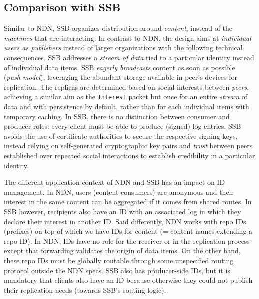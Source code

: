 \documentclass[9pt,sigconf]{acmart}
\begin{document}

\subsection{Comparison with SSB}

Similar to NDN, SSB organizes distribution around {\em content}, instead of the {\em machines} that are interacting. In contrast to NDN, the design aims at \textit{individual users as publishers} instead of larger organizations with the following technical consequences. SSB addresses a \textit{stream of data} tied to a particular identity instead of individual data items. SSB \textit{eagerly broadcasts} content as soon as possible (\textit{push-model}), leveraging the abundant storage available in peer's devices for replication. The replicas are determined based on social interests between \textit{peers}, achieving a similar aim as the \texttt{Interest} packet but once for an entire \textit{stream} of data and with persistence by default, rather than for each individual items with temporary caching. In SSB, there is no distinction between consumer and producer roles: every client must be able to produce (signed) log entries. SSB avoids the use of certificate authorities to secure the respective signing keys, instead relying on self-generated cryptographic key pairs and \textit{trust} between peers established over repeated social interactions to establish credibility in a particular identity.

The different application context of NDN and SSB has an impact on ID management. In NDN, users (content consumers) are anonymous and their interest in the same content can be aggregated if it comes from shared routes. In SSB however, recipients also have an ID with an associated log in which they declare their interest in another ID. Said differently, NDN works with repo IDs
(prefixes) on top of which we have IDs for content (= content names
extending a repo ID). In NDN, IDs have no role for the receiver or in
the replication process except that forwarding validates the origin of
data items. On the other hand, these repo IDs must be globally routable
through some unspecified routing protocol outside the NDN specs. SSB
also has producer-side IDs, but it is mandatory that clients also have
an ID because otherwise they could not publish their replication needs
(towards SSB's routing logic).
\end{document}
